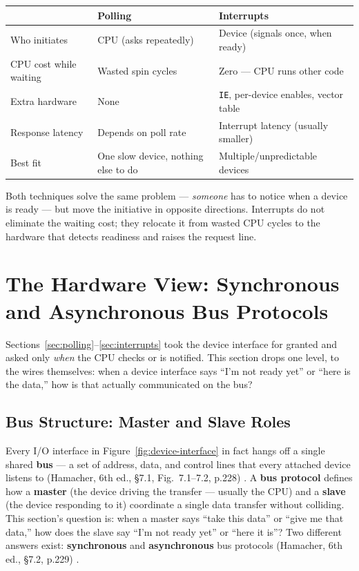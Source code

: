 \documentclass[11pt]{article}
\begin{document}
\begin{center}
\footnotesize
\begin{tabular}{@{}lll@{}}
\toprule
& \textbf{Polling} & \textbf{Interrupts} \\
\midrule
Who initiates & CPU (asks repeatedly) & Device (signals once, when ready) \\
CPU cost while waiting & Wasted spin cycles & Zero --- CPU runs other code \\
Extra hardware & None & \texttt{IE}, per-device enables, vector table \\
Response latency & Depends on poll rate & Interrupt latency (usually smaller) \\
Best fit & One slow device, nothing else to do & Multiple/unpredictable devices \\
\bottomrule
\end{tabular}
\end{center}

Both techniques solve the same problem --- \emph{someone} has to notice when a device is ready --- but move the initiative in opposite directions. Interrupts do not eliminate the waiting cost; they relocate it from wasted CPU cycles to the hardware that detects readiness and raises the request line.

\section{The Hardware View: Synchronous and Asynchronous Bus Protocols}
\label{sec:bus}

Sections~\ref{sec:polling}--\ref{sec:interrupts} took the device interface for granted and asked only \emph{when} the CPU checks or is notified. This section drops one level, to the wires themselves: when a device interface says ``I'm not ready yet'' or ``here is the data,'' how is that actually communicated on the bus?

\subsection{Bus Structure: Master and Slave Roles}

Every I/O interface in Figure~\ref{fig:device-interface} in fact hangs off a single shared \textbf{bus} --- a set of address, data, and control lines that every attached device listens to (Hamacher, 6th ed., \S7.1, Fig.~7.1--7.2, p.228) \cite{Hamacher2002_computer_organization}. A \textbf{bus protocol} defines how a \textbf{master} (the device driving the transfer --- usually the CPU) and a \textbf{slave} (the device responding to it) coordinate a single data transfer without colliding. This section's question is: when a master says ``take this data'' or ``give me that data,'' how does the slave say ``I'm not ready yet'' or ``here it is''? Two different answers exist: \textbf{synchronous} and \textbf{asynchronous} bus protocols (Hamacher, 6th ed., \S7.2, p.229) \cite{Hamacher2002_computer_organization}.
\end{document}
